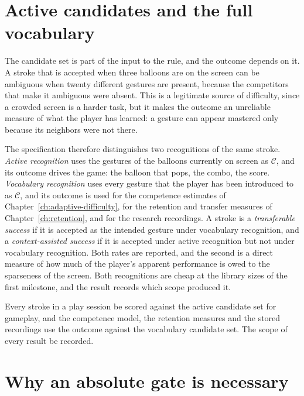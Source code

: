 \section{Active candidates and the full vocabulary}

The candidate set is part of the input to the rule, and the outcome depends on it. A stroke that is accepted when three balloons are on the screen can be ambiguous when twenty different gestures are present, because the competitors that make it ambiguous were absent. This is a legitimate source of difficulty, since a crowded screen is a harder task, but it makes the outcome an unreliable measure of what the player has learned: a gesture can appear mastered only because its neighbors were not there.

The specification therefore distinguishes two recognitions of the same stroke. \emph{Active recognition} uses the gestures of the balloons currently on screen as $\mathcal C$, and its outcome drives the game: the balloon that pops, the combo, the score. \emph{Vocabulary recognition} uses every gesture that the player has been introduced to as $\mathcal C$, and its outcome is used for the competence estimates of Chapter~\ref{ch:adaptive-difficulty}, for the retention and transfer measures of Chapter~\ref{ch:retention}, and for the research recordings. A stroke is a \emph{transferable success} if it is accepted as the intended gesture under vocabulary recognition, and a \emph{context-assisted success} if it is accepted under active recognition but not under vocabulary recognition. Both rates are reported, and the second is a direct measure of how much of the player's apparent performance is owed to the sparseness of the screen. Both recognitions are cheap at the library sizes of the first milestone, and the result records which scope produced it.

\begin{requirement}\label{req:two-scopes}
Every stroke in a play session \must{} be scored against the active candidate set for gameplay, and the competence model, the retention measures and the stored recordings \must{} use the outcome against the vocabulary candidate set. The scope of every result \must{} be recorded.\evS
\end{requirement}

\section{Why an absolute gate is necessary}

